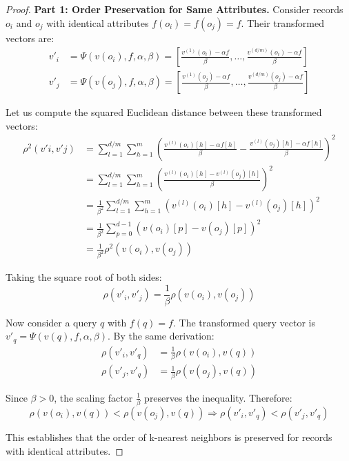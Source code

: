 \documentclass[10pt,a4paper]{amsart}
\begin{document}
\begin{proof}
\textbf{Part 1: Order Preservation for Same Attributes.}
Consider records $o_i$ and $o_j$ with identical attributes $f(o_i) = f(o_j) = f$. Their transformed vectors are:
\begin{align}
v'_i &= \Psi(v(o_i), f, \alpha, \beta) = \left[\frac{v^{(1)}(o_i) - \alpha f}{\beta}, \ldots, \frac{v^{(d/m)}(o_i) - \alpha f}{\beta}\right] \\
v'_j &= \Psi(v(o_j), f, \alpha, \beta) = \left[\frac{v^{(1)}(o_j) - \alpha f}{\beta}, \ldots, \frac{v^{(d/m)}(o_j) - \alpha f}{\beta}\right]
\end{align}

Let us compute the squared Euclidean distance between these transformed vectors:
\begin{align}
\rho^2(v'i, v'j) &= \sum_{l=1}^{d/m} \sum_{h=1}^{m} \left(\frac{v^{(l)}(o_i)[h] - \alpha f[h]}{\beta} - \frac{v^{(l)}(o_j)[h] - \alpha f[h]}{\beta}\right)^2 \\
&= \sum_{l=1}^{d/m} \sum_{h=1}^{m} \left(\frac{v^{(l)}(o_i)[h] - v^{(l)}(o_j)[h]}{\beta}\right)^2 \\
&= \frac{1}{\beta^2}\sum_{l=1}^{d/m} \sum_{h=1}^{m} \left(v^{(l)}(o_i)[h] - v^{(l)}(o_j)[h]\right)^2 \\
&= \frac{1}{\beta^2}\sum_{p=0}^{d-1} \left(v(o_i)[p] - v(o_j)[p]\right)^2 \\
&= \frac{1}{\beta^2}\rho^2(v(o_i), v(o_j))
\end{align}

Taking the square root of both sides:
\begin{equation}
\rho(v'_i, v'_j) = \frac{1}{\beta}\rho(v(o_i), v(o_j))
\end{equation}

Now consider a query $q$ with $f(q) = f$. The transformed query vector is $v'_q = \Psi(v(q), f, \alpha, \beta)$. By the same derivation:
\begin{align}
\rho(v'_i, v'_q) &= \frac{1}{\beta}\rho(v(o_i), v(q)) \\
\rho(v'_j, v'_q) &= \frac{1}{\beta}\rho(v(o_j), v(q))
\end{align}

Since $\beta > 0$, the scaling factor $\frac{1}{\beta}$ preserves the inequality. Therefore:
\begin{equation}
\rho(v(o_i), v(q)) < \rho(v(o_j), v(q)) \Rightarrow \rho(v'_i, v'_q) < \rho(v'_j, v'_q)
\end{equation}

This establishes that the order of k-nearest neighbors is preserved for records with identical attributes.


\end{proof}
\end{document}
